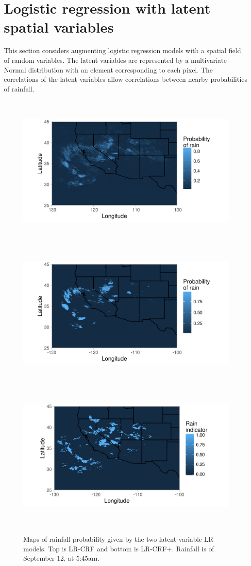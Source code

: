 \section{Logistic regression with latent spatial variables}

This section considers augmenting logistic regression models with a spatial field of random variables. The latent variables are represented by a multivariate Normal distribution with an element corresponding to each pixel. The correlations of the latent variables allow correlations between nearby probabilities of rainfall.

\begin{figure}[t]
\centering
\includegraphics[height=3in]{./R/prec.png}
\includegraphics[height=3in]{./R/prec_w.png}
\includegraphics[height=3in]{./R/prec_t.png}
\caption{Maps of rainfall probability given by the two latent variable LR models. Top is LR-CRF and bottom is LR-CRF+. Rainfall is of September 12, at 5:45am.}

\label{probprec}
\end{figure}


